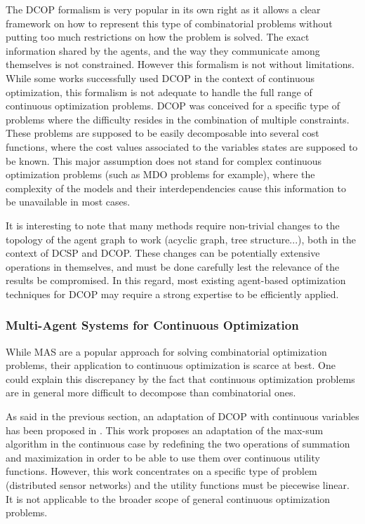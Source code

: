 The DCOP formalism is very popular in its own right as it allows a clear framework on how to represent this type of combinatorial problems without putting too much restrictions on how the problem is solved. The exact information shared by the agents, and the way they communicate among themselves is not constrained. However this formalism is not without limitations.\\
While some works successfully used DCOP in the context of continuous optimization\cite{stranders2009decentralised}, this formalism is not adequate to handle the full range of continuous optimization problems. DCOP was conceived for a specific type of problems where the difficulty resides in the combination of multiple constraints. These problems are supposed to be easily decomposable into several cost functions, where the cost values associated to the variables states are supposed to be known. This major assumption does not stand for complex continuous optimization problems (such as MDO problems for example), where the complexity of the models and their interdependencies cause this information to be unavailable in most cases. %

It is interesting to note that many methods require non-trivial changes to the topology of the agent graph to work (acyclic graph, tree structure...), both in the context of DCSP and DCOP. These changes can be potentially extensive operations in themselves, and must be done carefully lest the relevance of the results be compromised. In this regard, most existing agent-based optimization techniques for DCOP may require a strong expertise to be efficiently applied\cite{Ka2011.6}.

\subsubsection{Multi-Agent Systems for Continuous Optimization}

While MAS are a popular approach for solving combinatorial optimization problems, their application to continuous optimization is scarce at best. One could explain this discrepancy by the fact that continuous optimization problems are in general more difficult to decompose than combinatorial ones.

As said in the previous section, an adaptation of DCOP with continuous variables has been proposed in \cite{stranders2009decentralised}. This work proposes an adaptation of the max-sum algorithm in the continuous case by redefining the two operations of summation and maximization in order to be able to use them over continuous utility functions. However, this work concentrates on a specific type of problem (distributed sensor networks) and the utility functions must be piecewise linear. It is not applicable to the broader scope of general continuous optimization problems.

